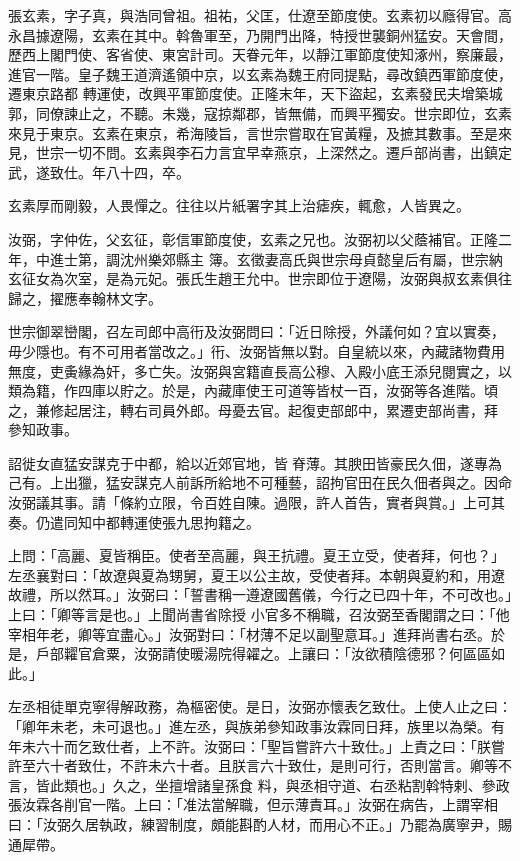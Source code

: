 \begin{pinyinscope}
 張玄素，字子真，與浩同曾祖。祖祐，父匡，仕遼至節度使。玄素初以廕得官。高永昌據遼陽，玄素在其中。斡魯軍至，乃開門出降，特授世襲銅州猛安。天會間，歷西上閣門使、客省使、東宮計司。天眷元年，以靜江軍節度使知涿州，察廉最，進官一階。皇子魏王道濟遙領中京，以玄素為魏王府同提點，尋改鎮西軍節度使，遷東京路都
 轉運使，改興平軍節度使。正隆末年，天下盜起，玄素發民夫增築城郭，同僚諫止之，不聽。未幾，寇掠鄰郡，皆無備，而興平獨安。世宗即位，玄素來見于東京。玄素在東京，希海陵旨，言世宗嘗取在官黃糧，及摭其數事。至是來見，世宗一切不問。玄素與李石力言宜早幸燕京，上深然之。遷戶部尚書，出鎮定武，遂致仕。年八十四，卒。



 玄素厚而剛毅，人畏憚之。往往以片紙署字其上治瘧疾，輒愈，人皆異之。



 汝弼，字仲佐，父玄征，彰信軍節度使，玄素之兄也。汝弼初以父蔭補官。正隆二年，中進士第，調沈州樂郊縣主
 簿。玄徵妻高氏與世宗母貞懿皇后有屬，世宗納玄征女為次室，是為元妃。張氏生趙王允中。世宗即位于遼陽，汝弼與叔玄素俱往歸之，擢應奉翰林文字。



 世宗御翠巒閣，召左司郎中高衎及汝弼問曰：「近日除授，外議何如？宜以實奏，毋少隱也。有不可用者當改之。」衎、汝弼皆無以對。自皇統以來，內藏諸物費用無度，吏夤緣為奸，多亡失。汝弼與宮籍直長高公穆、入殿小底王添兒閱實之，以類為籍，作四庫以貯之。於是，內藏庫使王可道等皆杖一百，汝弼等各進階。頃之，兼修起居注，轉右司員外郎。母憂去官。起復吏部郎中，累遷吏部尚書，拜
 參知政事。



 詔徙女直猛安謀克于中都，給以近郊官地，皆脊薄。其腴田皆豪民久佃，遂專為己有。上出獵，猛安謀克人前訴所給地不可種藝，詔拘官田在民久佃者與之。因命汝弼議其事。請「條約立限，令百姓自陳。過限，許人首告，實者與賞。」上可其奏。仍遣同知中都轉運使張九思拘籍之。



 上問：「高麗、夏皆稱臣。使者至高麗，與王抗禮。夏王立受，使者拜，何也？」左丞襄對曰：「故遼與夏為甥舅，夏王以公主故，受使者拜。本朝與夏約和，用遼故禮，所以然耳。」汝弼曰：「誓書稱一遵遼國舊儀，今行之已四十年，不可改也。」上曰：「卿等言是也。」上聞尚書省除授
 小官多不稱職，召汝弼至香閣謂之曰：「他宰相年老，卿等宜盡心。」汝弼對曰：「材薄不足以副聖意耳。」進拜尚書右丞。於是，戶部糶官倉粟，汝弼請使暖湯院得糴之。上讓曰：「汝欲積陰德邪？何區區如此。」



 左丞相徒單克寧得解政務，為樞密使。是日，汝弼亦懷表乞致仕。上使人止之曰：「卿年未老，未可退也。」進左丞，與族弟參知政事汝霖同日拜，族里以為榮。有年未六十而乞致仕者，上不許。汝弼曰：「聖旨嘗許六十致仕。」上責之曰：「朕嘗許至六十者致仕，不許未六十者。且朕言六十致仕，是則可行，否則當言。卿等不言，皆此類也。」久之，坐擅增諸皇孫食
 料，與丞相守道、右丞粘割斡特剌、參政張汝霖各削官一階。上曰：「准法當解職，但示薄責耳。」汝弼在病告，上謂宰相曰：「汝弼久居執政，練習制度，頗能斟酌人材，而用心不正。」乃罷為廣寧尹，賜通犀帶。




\end{pinyinscope}
